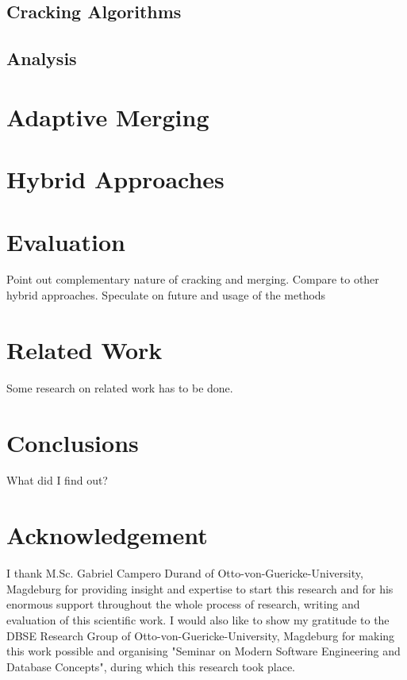 \documentclass[10pt, conference, compsocconf]{IEEEtran}
\begin{document}
\subsection{Cracking Algorithms}
\subsection{Analysis}

\section{Adaptive Merging}
\section{Hybrid Approaches}

\section{Evaluation}
Point out complementary nature of cracking and merging. Compare to other hybrid approaches. Speculate on future and usage of the methods

\section{Related Work}
Some research on related work has to be done.

\section{Conclusions}
What did I find out?

\section*{Acknowledgement}
I thank M.Sc. Gabriel Campero Durand of Otto-von-Guericke-University, Magdeburg for providing insight and expertise to start this research and for his enormous support throughout the whole process of research, writing and evaluation of this scientific work. I would also like to show my gratitude to the DBSE Research Group of Otto-von-Guericke-University, Magdeburg for making this work possible and organising "Seminar on Modern Software Engineering and Database Concepts", during which this research took place.
\end{document}
